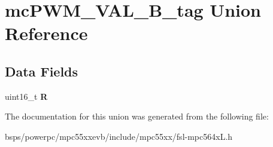 \hypertarget{unionmcPWM__VAL__16B__tag}{}\section{mc\+P\+W\+M\+\_\+\+V\+A\+L\+\_\+B\+\_\+tag Union Reference}
\label{unionmcPWM__VAL__16B__tag}
\subsection*{Data Fields}
\begin{DoxyCompactItemize}
\item 
\mbox{\label{unionmcPWM__VAL__16B__tag_aae957a3eba9a4bc37f6c0349e26eea81}} 
uint16\+\_\+t {\bfseries R}
\end{DoxyCompactItemize}


The documentation for this union was generated from the following file\+:\begin{DoxyCompactItemize}
\item 
bsps/powerpc/mpc55xxevb/include/mpc55xx/fsl-\/mpc564x\+L.\+h\end{DoxyCompactItemize}
